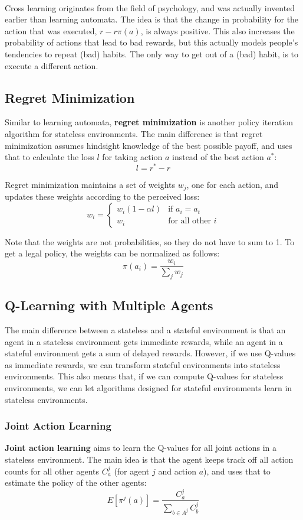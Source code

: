 \documentclass[12pt]{article}
\begin{document}
\noindent
\\
Cross learning originates from the field of psychology, and was actually invented earlier than learning automata.
The idea is that the change in probability for the action that was executed, $r - r \pi(a)$, is always positive.
This also increases the probability of actions that lead to bad rewards, but this actually models people's tendencies to repeat (bad) habits.
The only way to get out of a (bad) habit, is to execute a different action.

\subsection{Regret Minimization}
Similar to learning automata, \textbf{regret minimization} is another policy iteration algorithm for stateless environments.
The main difference is that regret minimization assumes hindsight knowledge of the best possible payoff, and uses that to calculate the loss $l$ for taking action $a$ instead of the best action $a^*$:
\[ l = r^* - r \]

\noindent
Regret minimization maintains a set of weights $w_j$, one for each action, and updates these weights according to the perceived loss:
\[ w_i = \begin{cases}
    w_i (1 - \alpha l) & \text{if } a_i = a_t \\
    w_i & \text{for all other } i
\end{cases} \]

\noindent
Note that the weights are not probabilities, so they do not have to sum to 1.
To get a legal policy, the weights can be normalized as follows:
\[ \pi(a_i) = \frac{w_i}{\sum_j w_j} \]

\subsection{Q-Learning with Multiple Agents}
The main difference between a stateless and a stateful environment is that an agent in a stateless environment gets immediate rewards, while an agent in a stateful environment gets a sum of delayed rewards.
However, if we use Q-values as immediate rewards, we can transform stateful environments into stateless environments.
This also means that, if we can compute Q-values for stateless environments, we can let algorithms designed for stateful environments learn in stateless environments.

\newpage
\subsubsection{Joint Action Learning}
\textbf{Joint action learning} aims to learn the Q-values for all joint actions in a stateless environment.
The main idea is that the agent keeps track off all action counts for all other agents $C^j_a$ (for agent $j$ and action $a$), and uses that to estimate the policy of the other agents:
\[ E[\pi^j(a)] = \frac{C^j_a}{\sum_{b \in A^j} C^j_b} \]
\end{document}
